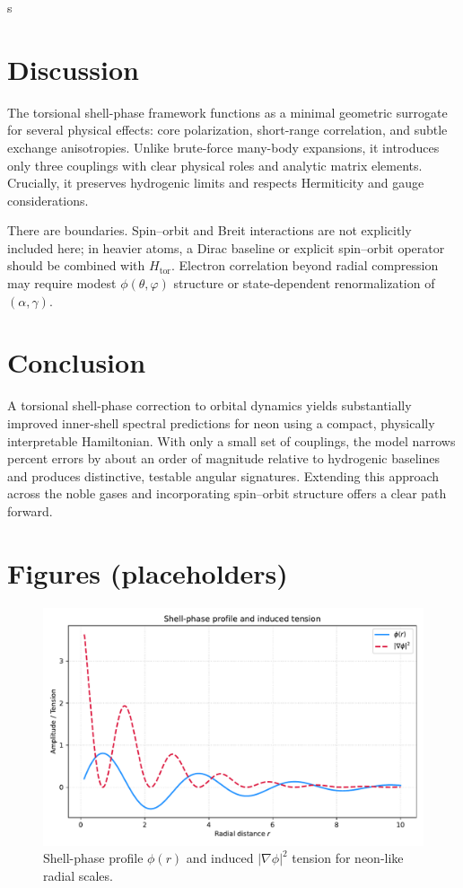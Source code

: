 s\documentclass[12pt]{article}
\begin{document}
\section{Discussion}
The torsional shell-phase framework functions as a minimal geometric surrogate for several physical effects: core polarization, short-range correlation, and subtle exchange anisotropies. Unlike brute-force many-body expansions, it introduces only three couplings with clear physical roles and analytic matrix elements. Crucially, it preserves hydrogenic limits and respects Hermiticity and gauge considerations.

There are boundaries. Spin--orbit and Breit interactions are not explicitly included here; in heavier atoms, a Dirac baseline or explicit spin--orbit operator should be combined with $H_{\mathrm{tor}}$.\cite{Grant} Electron correlation beyond radial compression may require modest $\phi(\theta,\varphi)$ structure or state-dependent renormalization of $(\alpha,\gamma)$.

\section{Conclusion}
A torsional shell-phase correction to orbital dynamics yields substantially improved inner-shell spectral predictions for neon using a compact, physically interpretable Hamiltonian. With only a small set of couplings, the model narrows percent errors by about an order of magnitude relative to hydrogenic baselines and produces distinctive, testable angular signatures. Extending this approach across the noble gases and incorporating spin--orbit structure offers a clear path forward.

\section*{Figures (placeholders)}
\begin{figure}[h]
\centering
\includegraphics[width=0.75\linewidth]{figures/fig1_shell_phase_profile.pdf}
\caption{Shell-phase profile $\phi(r)$ and induced $|\nabla \phi|^2$ tension for neon-like radial scales.}
\end{figure}
\end{document}
